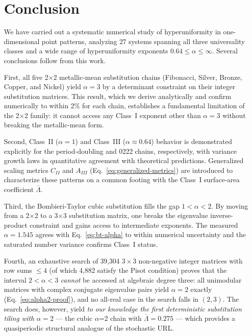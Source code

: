 \documentclass[11pt]{article}
\begin{document}
\section{Conclusion}
\label{sec:conclusion}

We have carried out a systematic numerical study of hyperuniformity in one-dimensional point
patterns, analyzing 27 systems spanning all three universality classes and a wide range of
hyperuniformity exponents $0.64 \leq \alpha \leq \infty$. Several conclusions follow from
this work.

First, all five 2$\times$2 metallic-mean substitution chains (Fibonacci, Silver, Bronze, Copper, and Nickel) yield
$\alpha = 3$ by a determinant constraint on their integer substitution matrices. This
result, which we derive analytically and confirm numerically to within 2\% for each chain,
establishes a fundamental limitation of the 2$\times$2 family: it cannot access any Class~I
exponent other than $\alpha = 3$ without breaking the metallic-mean form.

Second, Class~II ($\alpha = 1$) and Class~III ($\alpha \approx 0.64$) behavior is
demonstrated explicitly for the period-doubling and 0222 chains, respectively, with
variance growth laws in quantitative agreement with theoretical predictions. Generalized
scaling metrics $C_{II}$ and $A_{III}$ (Eq.~\ref{eq:generalized-metrics}) are introduced
to characterize these patterns on a common footing with the Class~I surface-area coefficient
$\bar{\Lambda}$.

Third, the Bombieri-Taylor cubic substitution fills the gap $1 < \alpha < 2$. By moving
from a 2$\times$2 to a 3$\times$3 substitution matrix, one breaks the eigenvalue
inverse-product constraint and gains access to intermediate exponents. The measured
$\alpha = 1.545$ agrees with Eq.~\eqref{eq:bt-alpha} to within numerical uncertainty and
the saturated number variance confirms Class~I status.

Fourth, an exhaustive search of 39,304 $3\times 3$ non-negative integer matrices with row sums $\leq 4$ (of which 4,882 satisfy the Pisot condition) proves that
the interval $2 < \alpha < 3$ \emph{cannot} be accessed at algebraic degree three: all
unimodular matrices with complex conjugate eigenvalue pairs yield $\alpha = 2$ exactly
(Eq.~\ref{eq:alpha2-proof}), and no all-real case in the search falls in $(2,3)$. The
search does, however, yield \emph{to our knowledge the first deterministic substitution tiling with
$\alpha = 2$} --- the cubic $\alpha$=2 chain with $\bar\Lambda = 0.275$ --- which provides
a quasiperiodic structural analogue of the stochastic URL.
\end{document}
